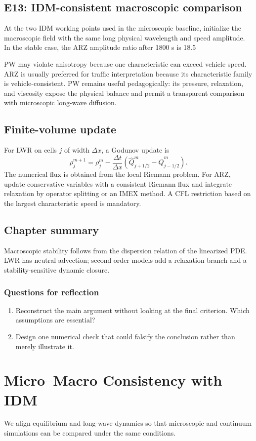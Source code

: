 \documentclass[11pt,a4paper,openany]{book}
\numberwithin{equation}{chapter}
\numberwithin{figure}{chapter}
\numberwithin{table}{chapter}
\newcommand{\chapterguide}[1]{\begin{tcolorbox}[keybox,title=Chapter guide]#1\end{tcolorbox}}
\newcommand{\chapterend}[1]{\section*{Chapter summary}\addcontentsline{toc}{section}{Chapter summary}\begin{tcolorbox}[resultbox]#1\end{tcolorbox}\subsection*{Questions for reflection}\begin{enumerate}[leftmargin=1.7em]\item Reconstruct the main argument without looking at the final criterion. Which assumptions are essential?\item Design one numerical check that could falsify the conclusion rather than merely illustrate it.\end{enumerate}\clearpage}
\begin{document}
\section{E13: IDM-consistent macroscopic comparison}
At the two IDM working points used in the microscopic baseline, initialize the macroscopic field with the same long physical wavelength and speed amplitude. In the stable case, the ARZ amplitude ratio after 1800 s is 18.5%

PW may violate anisotropy because one characteristic can exceed vehicle speed. ARZ is usually preferred for traffic interpretation because its characteristic family is vehicle-consistent. PW remains useful pedagogically: its pressure, relaxation, and viscosity expose the physical balance and permit a transparent comparison with microscopic long-wave diffusion.

\section{Finite-volume update}
For LWR on cells $j$ of width $\Delta x$, a Godunov update is
\begin{equation}
\rho_j^{m+1}=\rho_j^m-\frac{\Delta t}{\Delta x}
\left(\hat Q_{j+1/2}^m-\hat Q_{j-1/2}^m\right).
\end{equation}
The numerical flux is obtained from the local Riemann problem. For ARZ, update conservative variables with a consistent Riemann flux and integrate relaxation by operator splitting or an IMEX method. A CFL restriction based on the largest characteristic speed is mandatory.

\chapterend{Macroscopic stability follows from the dispersion relation of the linearized PDE. LWR has neutral advection; second-order models add a relaxation branch and a stability-sensitive dynamic closure.}

\chapter{Micro--Macro Consistency with IDM}
\chapterguide{We align equilibrium and long-wave dynamics so that microscopic and continuum simulations can be compared under the same conditions.}
\end{document}
